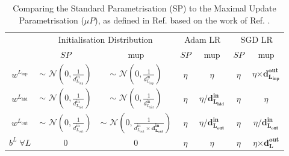 \begin{table}[h]
  \begin{center}
      \begin{tabular}{c|cc|cc|cc} 
      	 \hline \hline
          & \multicolumn{2}{c|}{Initialisation Distribution} & \multicolumn{2}{c|}{Adam LR} & \multicolumn{2}{c}{SGD LR}  \\
            & $SP$  & \gls{mup} & $SP$  & \gls{mup} & $SP$  & \gls{mup}  \\ \hline
          $w^{L_\textrm{inp}}$ & $\sim$ $\mathcal{N}\left(0, \frac{1}{d^{\textrm{in}}_{L_\textrm{inp}}}\right)$ & $\sim$ $\mathcal{N}\left(0, \frac{1}{d^{\textrm{in}}_{L_\textrm{inp}}}\right)$                                         & $\eta$ & $\eta$                                    & $\eta$ & $\eta \boldsymbol{\times d^{\textrm{out}}_{L_\textrm{inp}}}$ \\ 
          $w^{L_\textrm{hid}}$ & $\sim$ $\mathcal{N}\left(0, \frac{1}{d^{\textrm{in}}_{L_\textrm{hid}}}\right)$ & $\sim$ $\mathcal{N}\left(0, \frac{1}{d^{\textrm{in}}_{L_\textrm{hid}}}\right)$                                         & $\eta$ & $\eta \boldsymbol{/ d^{\textrm{in}}_{L_\textrm{hid}}}$ & $\eta$ & $\eta$                                    \\ 
          $w^{L_\textrm{out}}$ & $\sim$ $\mathcal{N}\left(0, \frac{1}{d^{\textrm{in}}_{L_\textrm{out}}}\right)$ & $\sim$ $\mathcal{N}\left(0, \frac{1}{d^{\textrm{in}}_{L_\textrm{out}}\times \boldsymbol{d^{\textrm{in}}_{L_\textrm{out}}}}\right)$  & $\eta$ & $\eta \boldsymbol{/ d^{\textrm{in}}_{L_\textrm{out}}}$ & $\eta$ & $\eta \boldsymbol{/ d^{\textrm{in}}_{L_\textrm{out}}}$ \\
          $b^{L} \;\forall L$ & 0 & 0                                                                                                                                                                                          & $\eta$ & $\eta$                                    & $\eta$ & $\eta \boldsymbol{\times d^{\textrm{out}}_{L}}$              \\  \hline \hline
      \end{tabular}
    \caption{Comparing the Standard Parametrisation (SP) to the Maximal Update Parametrisation ($\mu P$), as defined in Ref. \cite{yang2021tuning} based on the work of Ref. \cite{pmlr-v139-yang21c}.}
    \label{tab:mupvsspdef}
  \end{center}
\end{table}

